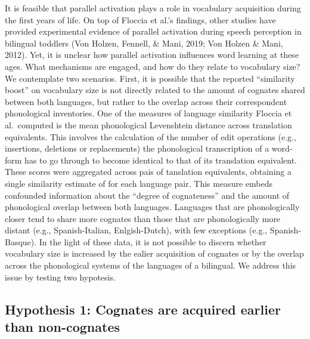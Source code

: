 \documentclass[english,man,man,floatsintext]{apa6}
\begin{document}
It is feasible that parallel activation plays a role in vocabulary acquisition during the first years of life. On top of Floccia et al.'s findings, other studies have provided experimental evidence of parallel activation during speech perception in bilingual toddlers (Von Holzen, Fennell, \& Mani, 2019; Von Holzen \& Mani, 2012). Yet, it is unclear how parallel activation influences word learning at these ages. What mechanisms are engaged, and how do they relate to vocabulary size? We contemplate two scenarios. First, it is possible that the reported \enquote{similarity boost} on vocabulary size is not directly related to the amount of cognates shared between both languages, but rather to the overlap across their correspondent phonological inventories. One of the measures of language similarity Floccia et al.~computed is the mean phonological Levenshtein distance across translation equivalents. This involves the calculation of the number of edit operations (e.g., insertions, deletions or replacements) the phonological transcription of a word-form has to go through to become identical to that of its translation equivalent. These scores were aggregated across pais of tanslation equivalents, obtaining a single similarity estimate of for each language pair. This measure embeds confounded information about the \enquote{degree of cognateness} and the amount of phonological overlap between both languages. Languages that are phonologically closer tend to share more cognates than those that are phonologically more distant (e.g., Spanish-Italian, Enlgish-Dutch), with few exceptions (e.g., Spanish-Basque). In the light of these data, it is not possible to discern whether vocabulary size is increased by the ealier acquisition of cognates or by the overlap across the phonological systems of the languages of a bilingual. We address this issue by testing two hypotesis.

\hypertarget{hypothesis-1-cognates-are-acquired-earlier-than-non-cognates}{%
\subsection{Hypothesis 1: Cognates are acquired earlier than non-cognates}\label{hypothesis-1-cognates-are-acquired-earlier-than-non-cognates}}
\end{document}
